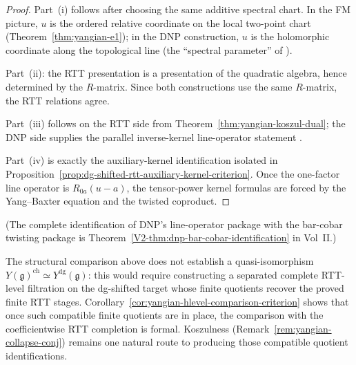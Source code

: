 \begin{proof}
Part~(i) follows after choosing the same additive spectral chart.  In
the FM picture, $u$ is the ordered relative coordinate on the local
two-point chart (Theorem~\ref{thm:yangian-e1}); in the DNP
construction, $u$ is the holomorphic coordinate along the topological
line (the ``spectral parameter'' of \cite[\S5]{DNP25}).

Part~(ii): the RTT presentation is a presentation of the
quadratic algebra, hence determined by the $R$-matrix.
Since both constructions use the same $R$-matrix, the
RTT relations agree.

Part~(iii) follows on the RTT side from
Theorem~\ref{thm:yangian-koszul-dual}; the DNP side supplies the
parallel inverse-kernel line-operator statement
\cite[Thm.~6.12]{DNP25}.

Part~(iv) is exactly the auxiliary-kernel identification isolated in
Proposition~\ref{prop:dg-shifted-rtt-auxiliary-kernel-criterion}.  Once
the one-factor line operator is $R_{0a}(u-a)$, the tensor-power
kernel formulas are forced by the Yang--Baxter equation and the
twisted coproduct.
\end{proof}

(The complete identification of DNP's line-operator package with the bar-cobar twisting package is Theorem~\ref{V2-thm:dnp-bar-cobar-identification} in Vol~II.)

\begin{remark}
\label{rem:dg-shifted-qi}
The structural comparison above does not establish a
quasi-isomorphism $Y(\mathfrak{g})^{\mathrm{ch}}
\simeq Y^{\mathrm{dg}}(\mathfrak{g})$: this would require
constructing a separated complete RTT-level filtration on the
dg-shifted target whose finite quotients recover the proved finite
RTT stages. Corollary~\ref{cor:yangian-hlevel-comparison-criterion}
shows that once such compatible finite quotients are in place, the
comparison with the coefficientwise RTT completion is formal.
Koszulness \ifannalsedition\else
(Remark~\ref{rem:yangian-collapse-conj})
\fi remains one natural
route to producing those compatible quotient identifications.
\end{remark}

